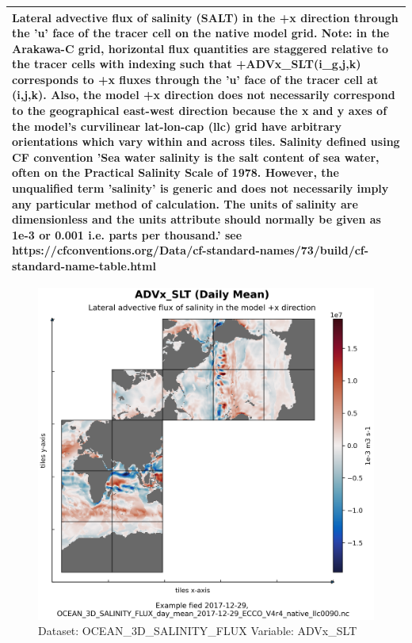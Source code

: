 \begin{longtable}{|p{}|p{}|p{}|p{}|}
\multicolumn{4}{|p{1\textwidth}|}{Lateral advective flux of salinity (SALT) in the +x direction through the 'u' face of the tracer cell on the native model grid. Note: in the Arakawa-C grid, horizontal flux quantities are staggered relative to the tracer cells with indexing such that +ADVx\_SLT(i\_g,j,k) corresponds to +x fluxes through the 'u' face of the tracer cell at (i,j,k). Also, the model +x direction does not necessarily correspond to the geographical east-west direction because the x and y axes of the model's curvilinear lat-lon-cap (llc) grid have arbitrary orientations which vary within and across tiles. Salinity defined using CF convention 'Sea water salinity is the salt content of sea water, often on the Practical Salinity Scale of 1978. However, the unqualified term 'salinity' is generic and does not necessarily imply any particular method of calculation. The units of salinity are dimensionless and the units attribute should normally be given as 1e-3 or 0.001 i.e. parts per thousand.' see https://cfconventions.org/Data/cf-standard-names/73/build/cf-standard-name-table.html} \\ \hline
\end{longtable}

\begin{figure}[H]
\centering
\includegraphics[width=\textwidth]{../images/plots/native_plots/Ocean_Three-Dimensional_Salinity_Fluxes/ADVx_SLT.png}
\caption{Dataset: OCEAN\_3D\_SALINITY\_FLUX Variable: ADVx\_SLT}
\label{tab:table-OCEAN_3D_SALINITY_FLUX_ADVx_SLT-Plot}
\end{figure}
\pagebreak

